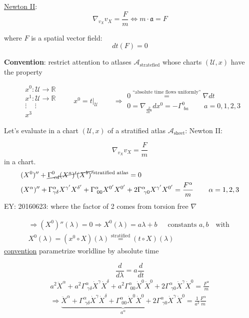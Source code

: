 \documentclass[10pt, twoside]{amsart}
\begin{document}
\begin{multicols*}{2}
\underline{Newton II}: 
\[
\nabla_{v_{X}} v_X = \frac{F}{m} \Longleftrightarrow m \cdot \mathfrak{a} = F
\]


where $F$ is a spatial vector field:
\[
dt(F) = 0 
\]

\textbf{Convention}: restrict attention to atlases $\mathcal{A}_{\text{stratefied}}$ whose charts $(\mathcal{U}, x)$ have the property

\[
\begin{aligned}
  & x^0:\mathcal{U} \to \mathbb{R} \\ 
  & x^1: \mathcal{U} \to \mathbb{R} \\ 
  & \vdots \quad \, \vdots \\ 
  & x^3
\end{aligned}
\quad \quad \, 
x^0 = \left. t \right|_{\mathcal{U}}  \quad\quad \, \Longrightarrow \begin{gathered} 0 \overset{\text{``absolute time flows uniformly''} }{=} \nabla dt \\
0 = \nabla_{\frac{ \partial }{ \partial x^a} } dx^0 = - \Gamma_{ \, \, ba }^0 \quad \quad \, a = 0,1,2,3
\end{gathered}
\]

Let's evaluate in a chart $(\mathcal{U},x)$ of a stratified atlas $\mathcal{A}_{\text{sheet}}$: Newton II:

\[
\nabla_{v_X} v_X = \frac{F}{m}
\]
in a chart.
\[
\begin{aligned}
& (X^0)'' + \cancel{ \Gamma^0_{ \, \, cd } (X^a)' (X^b)' }^{ \text{stratified atlas}} = 0  \\
  & (X^{\alpha})'' + \Gamma^{\alpha}_{\gamma \delta} X^{\gamma'} X^{\delta'} + \Gamma^{\alpha}_{ \, \, 00} X^{0'} X^{0'} + 2\Gamma^{\alpha}_{ \, \, \gamma 0} X^{\gamma'} X^{0'} = \frac{F^{\alpha}}{m} \quad \quad \, \alpha = 1,2,3
\end{aligned}
\]
EY: 20160623: where the factor of 2 comes from torsion free $\nabla$

\[
\begin{gathered}
\Longrightarrow (X^0)''(\lambda) = 0 \Longrightarrow X^0(\lambda) = a\lambda + b \quad \, \text{ constants $a,b$ } \text{ with  }  \\
X^0(\lambda) = (x^0 \circ X)(\lambda) \overset{\text{stratified}}{=} (t\circ X)(\lambda)
\end{gathered}
\]
\underline{convention} parametrize worldline by absolute time

\[
\frac{d}{d\lambda} = a \frac{d}{dt}
\]
\[
\begin{gathered}
a^2 \ddot{X}^{\alpha} + a^2 \Gamma^{\alpha}_{ \, \, \gamma \delta} \dot{X}^{\gamma} \dot{X}^{\delta} + a^2 \Gamma^{\alpha}_{ \, \, 00 } \dot{X}^0 \dot{X}^0 + 2\Gamma^{\alpha}_{ \, \,\gamma 0} \dot{X}^{\gamma} \dot{X}^{0} =  \frac{ F^{\alpha}}{ m} \\
\Longrightarrow  \underbrace{ \ddot{X}^{\alpha} +  \Gamma^{\alpha}_{ \, \, \gamma \delta} \dot{X}^{\gamma} \dot{X}^{\delta} +  \Gamma^{\alpha}_{ \, \, 00 } \dot{X}^0 \dot{X}^0 + 2\Gamma^{\alpha}_{ \, \,\gamma 0} \dot{X}^{\gamma} \dot{X}^{0} }_{a^{\alpha} } = \frac{1}{a^2} \frac{ F^{\alpha}}{ m} 
\end{gathered}
\]




\end{multicols*}
\end{document}
